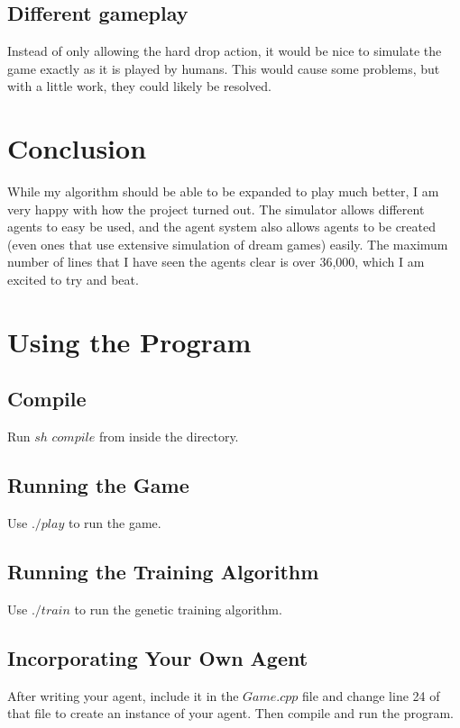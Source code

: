 \documentclass{article}
\begin{document}
\subsection{Different gameplay}
Instead of only allowing the hard drop action, it would be nice to simulate the game exactly as it is played by humans. This would cause some problems, but with a little work, they could likely be resolved.

\section{Conclusion}
While my algorithm should be able to be expanded to play much better, I am very happy with how the project turned out. The simulator allows different agents to easy be used, and the agent system also allows agents to be created (even ones that use extensive simulation of dream games) easily. The maximum number of lines that I have seen the agents clear is over 36,000, which I am excited to try and beat.

\clearpage

\section{Using the Program}
\subsection{Compile}
Run $sh$ $compile$ from inside the directory.
\subsection{Running the Game}
Use $./play$ to run the game.
\subsection{Running the Training Algorithm}
Use $./train$ to run the genetic training algorithm.
\subsection{Incorporating Your Own Agent}
After writing your agent, include it in the $Game.cpp$ file and change line 24 of that file to create an instance of your agent. Then compile and run the program.
\clearpage
\end{document}
